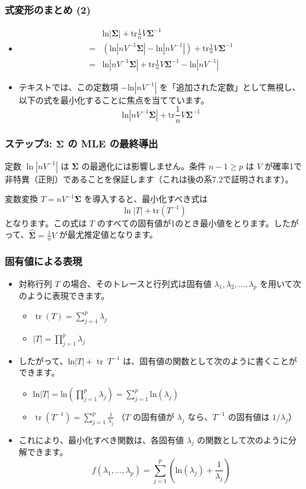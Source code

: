 \documentclass[aspectratio=169]{beamer}
\newcommand{\tr}{\operatorname{tr}}
\begin{document}
\begin{frame}
    \frametitle{式変形のまとめ (2)}
    \begin{itemize}
        \item
        \begin{align*}
        &\text{ln}|\bm{\Sigma}|+\text{tr}\frac{1}{n}V\bm{\Sigma}^{-1} \\
        =&(\text{ln}|nV^{-1}\bm{\Sigma}|-\text{ln}|nV^{-1}|)+\text{tr}\frac{1}{n}V\bm{\Sigma}^{-1} \\
        =&\text{ln}|nV^{-1}\bm{\Sigma}|+\text{tr}\frac{1}{n}V\bm{\Sigma}^{-1}-\text{ln}|nV^{-1}|
        \end{align*}
        \item テキストでは、この定数項 $-\text{ln}|nV^{-1}|$ を「追加された定数」として無視し、以下の式を最小化することに焦点を当てています。
        \[
        \text{ln}|nV^{-1}\bm{\Sigma}|+\text{tr}\frac{1}{n}V\bm{\Sigma}^{-1}
        \]
    \end{itemize}
\end{frame}

\begin{frame}
\frametitle{ステップ3: $\bm{\Sigma}$ の MLE の最終導出}
定数 $\ln|nV^{-1}|$ は $\bm{\Sigma}$ の最適化には影響しません。条件 $n-1 \ge p$ は $V$ が確率1で非特異（正則）であることを保証します（これは後の系7.2で証明されます）。

変数変換 $T = nV^{-1}\bm{\Sigma}$ を導入すると、最小化すべき式は
\[
\ln|T| + \mathrm{tr}(T^{-1})
\]
となります。この式は $T$ のすべての固有値が1のとき最小値をとります。したがって、$\hat{\bm{\Sigma}} = \frac{1}{n}V$ が最尤推定値となります。
\end{frame}

\begin{frame}
\frametitle{固有値による表現}
\begin{itemize}
    \item 対称行列 $T$ の場合、そのトレースと行列式は固有値 $\lambda_1,\lambda_2,\dots,\lambda_p$ を用いて次のように表現できます。
    \begin{itemize}
        \item $\tr(T)=\sum_{j=1}^{p}\lambda_j$
        \item $|T|=\prod_{j=1}^{p}\lambda_j$
    \end{itemize}
    \item したがって、$\text{ln}|T|+\tr~T^{-1}$ は、固有値の関数として次のように書くことができます。
    \begin{itemize}
        \item $\text{ln}|T|=\text{ln}(\prod_{j=1}^{p}\lambda_j)=\sum_{j=1}^{p}\text{ln}(\lambda_j)$
        \item $\tr(T^{-1})=\sum_{j=1}^{p}\frac{1}{\lambda_j}$ （$T$ の固有値が $\lambda_j$ なら、$T^{-1}$ の固有値は $1/\lambda_j$）
    \end{itemize}
    \item これにより、最小化すべき関数は、各固有値 $\lambda_j$ の関数として次のように分解できます。
    \[ f(\lambda_1,\dots,\lambda_p)=\sum_{j=1}^{p}\left(\text{ln}(\lambda_j)+\frac{1}{\lambda_j}\right) \]
\end{itemize}
\end{frame}
\end{document}
